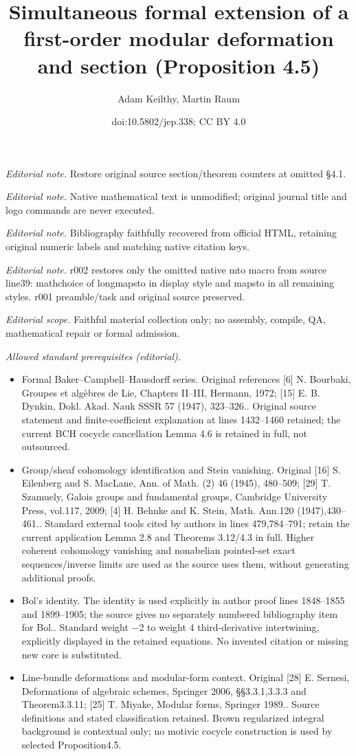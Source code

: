 \documentclass[10pt,a4paper]{article}
\title{Simultaneous formal extension of a first-order modular deformation and section (Proposition 4.5)}
\author{Adam Keilthy, Martin Raum}
\date{doi:10.5802/jep.338; CC BY 4.0}
\numberwithin{equation}{section}
\theoremstyle{plain}
\theoremstyle{definition}
\begin{document}
\maketitle
\noindent\textit{Editorial note.} Restore original source section/theorem counters at omitted §4.1.\par\medskip
\noindent\textit{Editorial note.} Native mathematical text is unmodified; original journal title and logo commands are never executed.\par\medskip
\noindent\textit{Editorial note.} Bibliography faithfully recovered from official HTML, retaining original numeric labels and matching native citation keys.\par\medskip
\noindent\textit{Editorial note.} r002 restores only the omitted native mto macro from source line39: mathchoice of longmapsto in display style and mapsto in all remaining styles. r001 preamble/task and original source preserved.\par\medskip
\noindent\textit{Editorial scope.} Faithful material collection only; no assembly, compile, QA, mathematical repair or formal admission.\par\medskip
\noindent\textit{Allowed standard prerequisites (editorial).}\begin{itemize}
\item Formal Baker–Campbell–Hausdorff series. Original references [6] N. Bourbaki, Groupes et algèbres de Lie, Chapters II–III, Hermann, 1972; [15] E. B. Dynkin, Dokl. Akad. Nauk SSSR 57 (1947), 323–326.. Original source statement and finite-coefficient explanation at lines 1432–1460 retained; the current BCH cocycle cancellation Lemma 4.6 is retained in full, not outsourced.
\item Group/sheaf cohomology identification and Stein vanishing. Original [16] S. Eilenberg and S. MacLane, Ann. of Math. (2) 46 (1945), 480–509; [29] T. Szamuely, Galois groups and fundamental groups, Cambridge University Press, vol.117, 2009; [4] H. Behnke and K. Stein, Math. Ann.120 (1947),430–461.. Standard external tools cited by authors in lines 479,784–791; retain the current application Lemma 2.8 and Theorems 3.12/4.3 in full. Higher coherent cohomology vanishing and nonabelian pointed-set exact sequences/inverse limits are used as the source uses them, without generating additional proofs.
\item Bol's identity. The identity is used explicitly in author proof lines 1848–1855 and 1899–1905; the source gives no separately numbered bibliography item for Bol.. Standard weight −2 to weight 4 third-derivative intertwining, explicitly displayed in the retained equations. No invented citation or missing new core is substituted.
\item Line-bundle deformations and modular-form context. Original [28] E. Sernesi, Deformations of algebraic schemes, Springer 2006, §§3.3.1,3.3.3 and Theorem3.3.11; [25] T. Miyake, Modular forms, Springer 1989.. Source definitions and stated classification retained. Brown regularized integral background is contextual only; no motivic cocycle construction is used by selected Proposition4.5.
\end{itemize}\medskip
\end{document}
